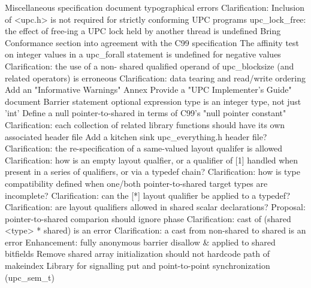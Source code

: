 {      \or %
        Miscellaneous specification document typographical errors
      \or %
        Clarification: Inclusion of <upc.h> is not required for strictly conforming UPC programs
      \or %
        upc\_lock\_free: the effect of free-ing a UPC lock held by another thread is undefined
      \or %
        Bring Conformance section into agreement with the C99 specification
      \or %
        The affinity test on integer values in a upc\_forall statement is undefined for negative values
      \or %
        Clarification: the use of a non- shared qualified operand of upc\_blocksize (and related operators) is erroneous
      \or %
        Clarification: data tearing and read/write ordering
      \or %
        Add an "Informative Warnings" Annex
      \or %
        Provide a "UPC Implementer's Guide" document
      \or %
        Barrier statement optional expression type is an integer type, not just 'int'
      \or %
        Define a null pointer-to-shared in terms of C99's "null pointer constant"
      \or %
        Clarification: each collection of related library functions should have its own associated header file
      \or %
        Add a kitchen sink upc\_everything.h header file?
      \or %
        Clarification: the re-specification of a same-valued layout qualifer is allowed
      \or %
        Clarification: how is an empty layout qualfier, or a qualifier of [1] handled when present in a series of qualifiers, or via a typedef chain?
      \or %
        Clarification: how is type compatibility defined when one/both pointer-to-shared target types are incomplete?
      \or %
        Clarification: can the [*] layout qualifier be applied to a typedef?
      \or %
        Clarification: are layout qualifiers allowed in shared scalar declarations?
      \or %
        Proposal: pointer-to-shared comparion should ignore phase
      \or %
        Clarification: cast of (shared <type> * shared) is an error
      \or %
        Clarification: a cast from non-shared to shared is an error
      \or %
        Enhancement: fully anonymous barrier
      \or %
        disallow & applied to shared bitfields
      \or %
        Remove shared array initialization
      \or %
        should not hardcode path of makeindex
      \or %
        Library for signalling put and point-to-point synchronization (upc\_sem\_t)
}
